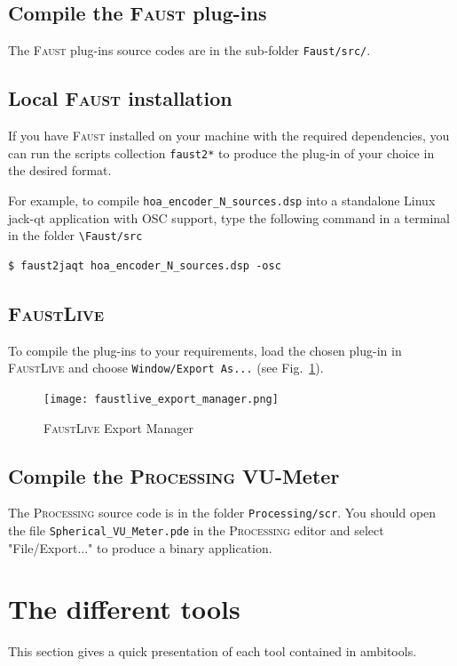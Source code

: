 \documentclass[10pt,a4paper]{article}
\begin{document}
\subsection{Compile the \textsc{Faust} plug-ins}
The \textsc{Faust} plug-ins source codes are in the sub-folder \lstinline'Faust/src/'. 

\subsection{Local \textsc{Faust} installation}
If you have \textsc{Faust} installed on your machine with the required dependencies, you can run the scripts collection \lstinline'faust2*' to produce the plug-in of your choice in the desired format. 

For example, to compile \lstinline'hoa_encoder_N_sources.dsp' into a standalone Linux jack-qt application with \textsc{OSC} support, type the following command in a terminal in the folder \lstinline'\Faust/src'

\begin{lstlisting}
$ faust2jaqt hoa_encoder_N_sources.dsp -osc
\end{lstlisting}

\subsection{\textsc{FaustLive}}
To compile the plug-ins to your requirements, load the chosen plug-in in \textsc{FaustLive} and choose \lstinline'Window/Export As...' (see Fig.~\ref{fig:faustlive}).
\begin{figure}[!ht]
\centering
\texttt{[image: faustlive\_export\_manager.png]}
\caption{\textsc{FaustLive} Export Manager}
\label{fig:faustlive}
\end{figure}

\subsection{Compile the \textsc{Processing} VU-Meter}
The \textsc{Processing} source code is in the folder \lstinline'Processing/scr'. You should open the file \lstinline'Spherical_VU_Meter.pde' in the \textsc{Processing} editor and select "File/Export..." to produce a binary application.

\section{The different tools}
This section gives a quick presentation of each tool contained in ambitools. 
\end{document}
